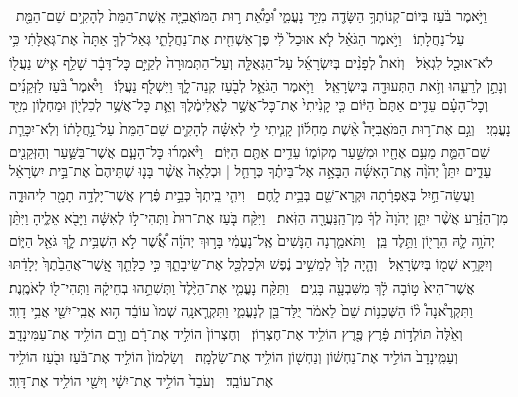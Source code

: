 \documentclass[12pt]{article}
\newcommand{\loc}[1]{\textsuperscript{\locf{#1}}}
\begin{document}
{\loc{ ה}~}‏וַיֹּ֣אמֶר בֹּ֔עַז בְּיוֹם־קְנוֹתְךָ֥ הַשָּׂדֶ֖ה מִיַּ֣ד נָעֳמִ֑י וּ֠מֵאֵ֠ת ר֣וּת הַמּוֹאֲבִיָּ֤ה אֵֽשֶׁת־הַמֵּת֙  לְהָקִ֥ים שֵׁם־הַמֵּ֖ת עַל־נַחֲלָתֽוֹ׃
{\loc{ ו}~}‏וַיֹּ֣אמֶר הַגֹּאֵ֗ל לֹ֤א אוּכַל֙ לִ֔י פֶּן־אַשְׁחִ֖ית אֶת־נַחֲלָתִ֑י גְּאַל־לְךָ֤ אַתָּה֙ אֶת־גְּאֻלָּתִ֔י כִּ֥י לֹא־אוּכַ֖ל לִגְאֹֽל׃
{\loc{ ז}~}‏וְזֹאת֩ לְפָנִ֨ים בְּיִשְׂרָאֵ֜ל עַל־הַגְּאֻלָּ֤ה וְעַל־הַתְּמוּרָה֙ לְקַיֵּ֣ם כׇּל־דָּבָ֔ר שָׁלַ֥ף אִ֛ישׁ נַעֲל֖וֹ וְנָתַ֣ן לְרֵעֵ֑הוּ וְזֹ֥את הַתְּעוּדָ֖ה בְּיִשְׂרָאֵֽל׃
{\loc{ ח}~}‏וַיֹּ֧אמֶר הַגֹּאֵ֛ל לְבֹ֖עַז קְנֵה־לָ֑ךְ וַיִּשְׁלֹ֖ף נַעֲלֽוֹ׃
{\loc{ ט}~}‏וַיֹּ֩אמֶר֩ בֹּ֨עַז לַזְּקֵנִ֜ים וְכׇל־הָעָ֗ם עֵדִ֤ים אַתֶּם֙ הַיּ֔וֹם כִּ֤י קָנִ֙יתִי֙ אֶת־כׇּל־אֲשֶׁ֣ר לֶאֱלִימֶ֔לֶךְ וְאֵ֛ת כׇּל־אֲשֶׁ֥ר לְכִלְי֖וֹן וּמַחְל֑וֹן מִיַּ֖ד נָעֳמִֽי׃
{\loc{ י}~}‏וְגַ֣ם אֶת־ר֣וּת הַמֹּאֲבִיָּה֩ אֵ֨שֶׁת מַחְל֜וֹן קָנִ֧יתִי לִ֣י לְאִשָּׁ֗ה לְהָקִ֤ים שֵׁם־הַמֵּת֙ עַל־נַ֣חֲלָת֔וֹ וְלֹֽא־יִכָּרֵ֧ת שֵׁם־הַמֵּ֛ת מֵעִ֥ם אֶחָ֖יו וּמִשַּׁ֣עַר מְקוֹמ֑וֹ עֵדִ֥ים אַתֶּ֖ם הַיּֽוֹם׃
{\loc{ יא}~}‏וַיֹּ֨אמְר֜וּ כׇּל־הָעָ֧ם אֲשֶׁר־בַּשַּׁ֛עַר וְהַזְּקֵנִ֖ים עֵדִ֑ים יִתֵּן֩ יְהֹוָ֨ה אֶֽת־הָאִשָּׁ֜ה הַבָּאָ֣ה אֶל־בֵּיתֶ֗ךָ כְּרָחֵ֤ל | וּכְלֵאָה֙ אֲשֶׁ֨ר בָּנ֤וּ שְׁתֵּיהֶם֙ אֶת־בֵּ֣ית יִשְׂרָאֵ֔ל וַעֲשֵׂה־חַ֣יִל בְּאֶפְרָ֔תָה וּקְרָא־שֵׁ֖ם בְּבֵ֥ית לָֽחֶם׃
{\loc{ יב}~}‏וִיהִ֤י בֵֽיתְךָ֙ כְּבֵ֣ית פֶּ֔רֶץ אֲשֶׁר־יָלְדָ֥ה תָמָ֖ר לִיהוּדָ֑ה מִן־הַזֶּ֗רַע אֲשֶׁ֨ר יִתֵּ֤ן יְהֹוָה֙ לְךָ֔ מִן־הַֽנַּעֲרָ֖ה הַזֹּֽאת׃
{\loc{ יג}~}‏וַיִּקַּ֨ח בֹּ֤עַז אֶת־רוּת֙ וַתְּהִי־ל֣וֹ לְאִשָּׁ֔ה וַיָּבֹ֖א אֵלֶ֑יהָ וַיִּתֵּ֨ן יְהֹוָ֥ה לָ֛הּ הֵרָי֖וֹן וַתֵּ֥לֶד בֵּֽן׃
{\loc{ יד}~}‏וַתֹּאמַ֤רְנָה הַנָּשִׁים֙ אֶֽל־נָעֳמִ֔י בָּר֣וּךְ יְהֹוָ֔ה אֲ֠שֶׁ֠ר לֹ֣א הִשְׁבִּ֥ית לָ֛ךְ גֹּאֵ֖ל הַיּ֑וֹם וְיִקָּרֵ֥א שְׁמ֖וֹ בְּיִשְׂרָאֵֽל׃
{\loc{ טו}~}‏וְהָ֤יָה לָךְ֙ לְמֵשִׁ֣יב נֶ֔פֶשׁ וּלְכַלְכֵּ֖ל אֶת־שֵׂיבָתֵ֑ךְ כִּ֣י כַלָּתֵ֤ךְ אֲֽשֶׁר־אֲהֵבַ֙תֶךְ֙ יְלָדַ֔תּוּ אֲשֶׁר־הִיא֙ ט֣וֹבָה לָ֔ךְ מִשִּׁבְעָ֖ה בָּנִֽים׃
{\loc{ טז}~}‏וַתִּקַּ֨ח נָעֳמִ֤י אֶת־הַיֶּ֙לֶד֙ וַתְּשִׁתֵ֣הוּ בְחֵיקָ֔הּ וַתְּהִי־ל֖וֹ לְאֹמֶֽנֶת׃
{\loc{ יז}~}‏וַתִּקְרֶ֩אנָה֩ ל֨וֹ הַשְּׁכֵנ֥וֹת שֵׁם֙ לֵאמֹ֔ר יֻלַּד־בֵּ֖ן לְנָעֳמִ֑י וַתִּקְרֶ֤אנָֽה שְׁמוֹ֙ עוֹבֵ֔ד ה֥וּא אֲבִֽי־יִשַׁ֖י אֲבִ֥י דָוִֽד׃
{\loc{ יח}~}‏וְאֵ֙לֶּה֙ תּוֹלְד֣וֹת פָּ֔רֶץ פֶּ֖רֶץ הוֹלִ֥יד אֶת־חֶצְרֽוֹן׃
{\loc{ יט}~}‏וְחֶצְרוֹן֙ הוֹלִ֣יד אֶת־רָ֔ם וְרָ֖ם הוֹלִ֥יד אֶת־עַמִּינָדָֽב׃
{\loc{ כ}~}‏וְעַמִּֽינָדָב֙ הוֹלִ֣יד אֶת־נַחְשׁ֔וֹן וְנַחְשׁ֖וֹן הוֹלִ֥יד אֶת־שַׂלְמָֽה׃
{\loc{ כא}~}‏וְשַׂלְמוֹן֙ הוֹלִ֣יד אֶת־בֹּ֔עַז וּבֹ֖עַז הוֹלִ֥יד אֶת־עוֹבֵֽד׃
{\loc{ כב}~}‏וְעֹבֵד֙ הוֹלִ֣יד אֶת־יִשָׁ֔י וְיִשַׁ֖י הוֹלִ֥יד אֶת־דָּוִֽד׃\pend
    \endnumbering
    
\end{document}
